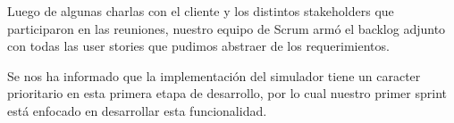 Luego de algunas charlas con el cliente y los distintos stakeholders que participaron en las reuniones, 
nuestro equipo de Scrum armó el backlog adjunto con todas las user stories que pudimos abstraer de los requerimientos.

Se nos ha informado que la implementación del simulador tiene un caracter prioritario en esta primera etapa de desarrollo, por lo cual
nuestro primer sprint está enfocado en desarrollar esta funcionalidad.
